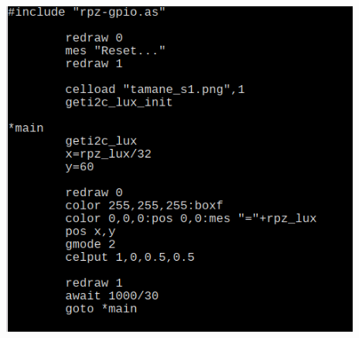 \documentclass[a4paper,dvipdfmx]{jarticle}
\begin{document}
\begin{center}
\includegraphics[width=11.615cm,height=10.94cm]{text04-img/text04-img040.png}

\end{center}

\bigskip


\bigskip


\bigskip


\bigskip


\bigskip


\bigskip


\bigskip


\bigskip


\bigskip


\bigskip


\bigskip


\bigskip


\bigskip


\bigskip


\bigskip


\bigskip


\bigskip


\bigskip


\bigskip


\bigskip


\bigskip


\bigskip


\bigskip


\bigskip


\bigskip


\bigskip
\end{document}
